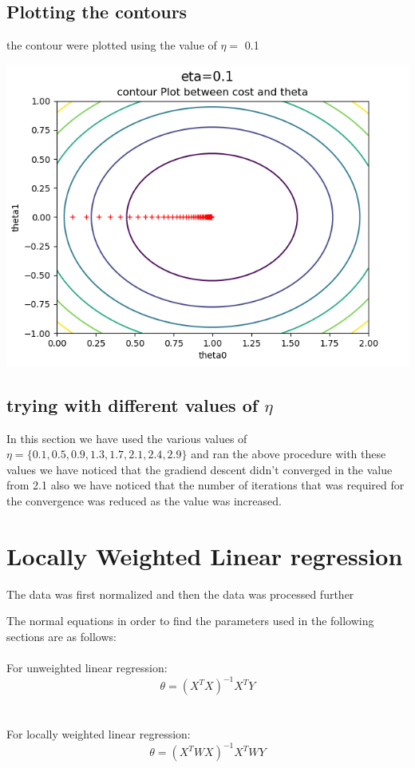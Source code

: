 \documentclass[10pt]{article}
\begin{document}
\subsection{Plotting the contours}
the contour were plotted using the value of $\eta=$ 0.1
\\
\begin{center}
\includegraphics[scale=0.8]{contourplot01.png} 
\end{center}

\subsection{trying with different values of $\eta$}
In this section we have used the various values of $\eta=\{0.1,0.5,0.9,1.3,1.7,2.1,2.4,2.9\}$ and ran the above procedure with these values we have noticed that the gradiend descent didn't converged in the 
value from 2.1 also we have noticed that the number of iterations that was required for the convergence was reduced as the value was increased.
\\
\newpage
\section{Locally Weighted Linear regression}
The data was first normalized and then the data was processed further

The normal equations in order to find the parameters used in the following sections are as follows:
\\
\\
For unweighted linear regression:
$$\theta=(X^TX)^{-1}X^TY$$
\\
\\
For locally weighted linear regression:
$$\theta=(X^TWX)^{-1}X^TWY$$
\end{document}
